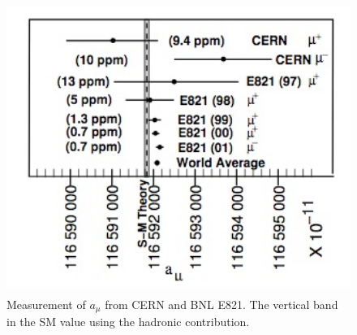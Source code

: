 \documentclass[./Thesis]{subfiles}
\begin{document}
\begin{figure}
\centerline{\includegraphics[height=95mm]{E821Result.jpg}}
\caption[$a_\mu$ results after E821]{ Measurement of $a_\mu$ from CERN and BNL E821. The vertical band in the SM value using the hadronic contribution. \cite{TDR}
	}
\label{fig:E821Results}
\end{figure}
\end{document}
